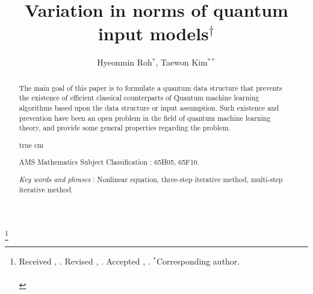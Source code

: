 \documentclass[10pt,twoside,reqno]{amsart} %
\theoremstyle{plain}
\theoremstyle{definition}
\begin{document}
\vspace{-0.15cm}



\vspace{1.3cm}

\title
{ %
Variation in norms of quantum input models$^\dagger$  
}

\author
{ %
  Hyeonmin Roh$^*$, Taewon Kim$^{**}$ 
}

\thanks{ {\scriptsize  Received     ,     .  Revised ,   .    Accepted     ,   . \enskip $^*$Corresponding author.}\\
\\
}


\maketitle


\begin{abstract}
  The main goal of this paper is to formulate a quantum data structure that
  prevents the existence of efficient classical counterparts of Quantum machine
  learning algorithms based upon the data structure or input assumption. Such
  existence and prevention have been an open problem in the field of quantum
  machine learning theory, and provide some general properties regarding the
  problem. %

 true cm


\noindent
 AMS Mathematics Subject Classification : 65H05, 65F10.

\noindent 
{\it Key words and phrases } : %
Nonlinear equation, three-step iterative method, multi-step iterative method.

\end{abstract}
\end{document}
